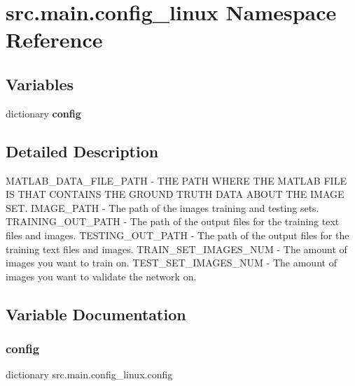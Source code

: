 \hypertarget{namespacesrc_1_1main_1_1config__linux}{}\section{src.\+main.\+config\+\_\+linux Namespace Reference}
\label{namespacesrc_1_1main_1_1config__linux}
\subsection*{Variables}
\begin{DoxyCompactItemize}
\item 
dictionary {\bfseries config}
\end{DoxyCompactItemize}


\subsection{Detailed Description}
\begin{DoxyVerb}MATLAB_DATA_FILE_PATH - THE PATH WHERE THE MATLAB FILE IS THAT CONTAINS THE GROUND TRUTH DATA ABOUT THE IMAGE SET.
IMAGE_PATH - The path of the images training and testing sets.
TRAINING_OUT_PATH - The path of the output files for the training text files and images.
TESTING_OUT_PATH - The path of the output files for the training text files and images.
TRAIN_SET_IMAGES_NUM - The amount of images you want to train on.
TEST_SET_IMAGES_NUM - The amount of images you want to validate the network on.\end{DoxyVerb}
 

\subsection{Variable Documentation}
\mbox{\label{namespacesrc_1_1main_1_1config__linux_a5a0232dea3b242452f56f75881cc5df1}} 
\subsubsection{\texorpdfstring{config}{config}}
{\footnotesize\ttfamily dictionary src.\+main.\+config\+\_\+linux.\+config}

